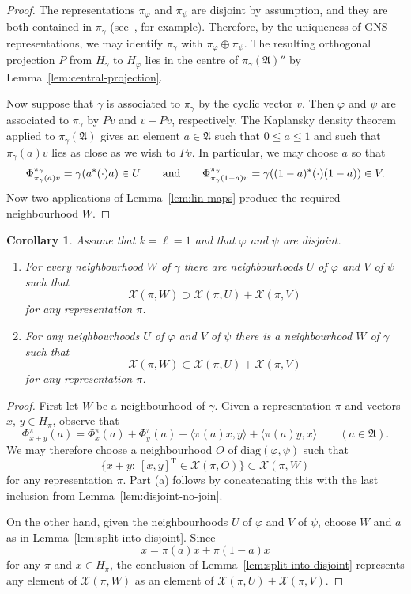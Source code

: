 \documentclass[12pt,a4paper]{article}
\numberwithin{equation}{section}
\newtheorem{cor}[thm]{Corollary}
\theoremstyle{remark}
\renewcommand{\rm}[1]{\mathrm{#1}}
\newcommand{\X}{\mathcal{X}}
\newcommand{\A}{\mathfrak{A}}
\renewcommand{\phi}{\varphi}
\newcommand{\g}{\gamma}
\begin{document}
\begin{proof}
The representations $\pi_\phi$ and $\pi_\psi$ are disjoint by assumption, and they are both contained in $\pi_\g$ (see~\cite[Prop. 2.5.1]{Dix--Cstar}, for example).  Therefore, by the uniqueness of GNS representations, we may identify $\pi_\g$ with ${\pi_\phi\oplus \pi_\psi}$.  The resulting orthogonal projection $P$ from $H_\g$ to $H_\phi$ lies in the centre of $\pi_\g(\A)''$ by Lemma~\ref{lem:central-projection}.

Now suppose that $\g$ is associated to $\pi_\g$ by the cyclic vector $v$.  Then $\phi$ and $\psi$ are associated to $\pi_\g$ by $Pv$ and $v-Pv$, respectively. The Kaplansky density theorem~\cite[Sec. I.3.5]{Dix--vN} applied to $\pi_\g(\A)$ gives an element $a \in \A$ such that $0\le a \le 1$ and such that $\pi_\g(a)v$ lies as close as we wish to $Pv$.  In particular, we may choose $a$ so that
\[\Phi^{\pi_\g}_{\pi_\g(a)v} = \g(a^\ast(\cdot)a) \in U \qquad \hbox{and} \qquad \Phi^{\pi_\g}_{\pi_\g(1-a)v} = \g((1-a)^\ast(\cdot)(1-a)) \in V.\]
Now two applications of Lemma~\ref{lem:lin-maps} produce the required neighbourhood $W$.
\end{proof}


\begin{cor}\label{cor:sums}
Assume that $k=\ell=1$ and that $\phi$ and $\psi$ are disjoint.
\begin{enumerate}
\item[a.] For every neighbourhood $W$ of $\g$ there are neighbourhoods $U$ of $\phi$ and $V$ of $\psi$ such that
\[\X(\pi,W)\supset \X(\pi,U) + \X(\pi,V)\]
for any representation $\pi$.
\item[b.] For any neighbourhoods $U$ of $\phi$ and $V$ of $\psi$ there is a neighbourhood $W$ of $\g$ such that
\[\X(\pi,W) \subset \X(\pi,U) + \X(\pi,V)\]
for any representation $\pi$.
\end{enumerate}
\end{cor}

\begin{proof}
First let $W$ be a neighbourhood of $\g$. Given a representation $\pi$ and vectors $x$, $y \in H_\pi$, observe that
\[\Phi^\pi_{x+y}(a) = \Phi^\pi_x(a) + \Phi^\pi_y(a) + \langle \pi(a)x,y\rangle + \langle \pi(a)y,x\rangle \qquad (a \in \A).\]
We may therefore choose a neighbourhood $O$ of $\rm{diag}(\phi,\psi)$ such that
\[\{x+y:\ [x,y]^\rm{T} \in \X(\pi,O)\} \subset \X(\pi,W)\]
for any representation $\pi$.  Part (a) follows by concatenating this with the last inclusion from Lemma~\ref{lem:disjoint-no-join}.

On the other hand, given the neighbourhoods $U$ of $\phi$ and $V$ of $\psi$, choose $W$ and $a$ as in Lemma~\ref{lem:split-into-disjoint}.  Since
\[x = \pi(a)x + \pi(1-a)x\]
for any $\pi$ and $x \in H_\pi$, the conclusion of Lemma~\ref{lem:split-into-disjoint} represents any element of $\X(\pi,W)$ as an element of $\X(\pi,U) + \X(\pi,V)$.
\end{proof}
\end{document}
